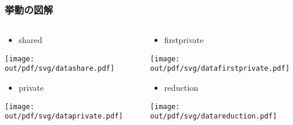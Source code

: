 \documentclass[10pt,dvipdfmx]{beamer}
\begin{document}
\begin{frame}[fragile]
\frametitle{挙動の図解}
\begin{columns}[t]
\begin{column}{0.5\textwidth}
  \begin{itemize}
  \item [] shared
  \end{itemize}
\begin{center}
\texttt{[image: out/pdf/svg/datashare.pdf]}
\end{center}

  \begin{itemize}
  \item [] private
  \end{itemize}
\begin{center}
\texttt{[image: out/pdf/svg/dataprivate.pdf]}
\end{center}
\end{column}

\begin{column}{0.5\textwidth}
\begin{itemize}
\item [] firstprivate
\end{itemize}
\begin{center}
\texttt{[image: out/pdf/svg/datafirstprivate.pdf]}
\end{center}

\begin{itemize}
\item [] reduction
\end{itemize}
\begin{center}
\texttt{[image: out/pdf/svg/datareduction.pdf]}
\end{center}
\end{column}
\end{columns}
\end{frame}
\end{document}
